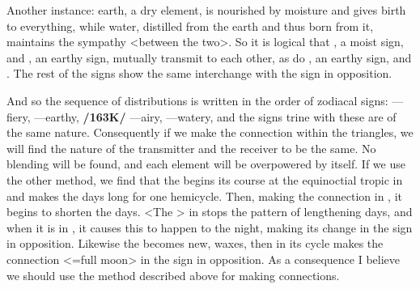 Another instance: earth, a dry element, is nourished by moisture and gives birth to everything, while water, distilled from the earth and thus born from it, maintains the sympathy <between the two>. So it is logical that \Cancer, a moist sign, and \Capricorn, an earthy sign, mutually transmit to each other, as do \Virgo, an earthy sign, and \Pisces. The rest of the signs show the same interchange with the sign in opposition. 

And so the sequence of distributions is written in the order of zodiacal signs: \Aries—fiery, \Taurus—earthy, \textbf{/163K/} \Gemini—airy, \Cancer—watery, and the signs trine with these are of the same nature. Consequently if we make the connection within the triangles, we will find the nature of the transmitter and the receiver to be the same. No blending will be found, and each element will be overpowered by itself. If we use the other method, we find that the \Sun\xspace begins its course at the equinoctial tropic in \Aries\xspace and makes the days long for one hemicycle. Then, making the connection in \Libra, it begins to shorten the days. <The \Sun> in \Cancer\xspace stops the pattern of lengthening days, and when it is in \Capricorn, it causes this to happen to the night, making its change in the sign in opposition. Likewise the \Moon\xspace becomes new, waxes, then in its cycle makes the connection <=full moon> in the sign in opposition. As a
consequence I believe we should use the method described above for making connections.


\newpage